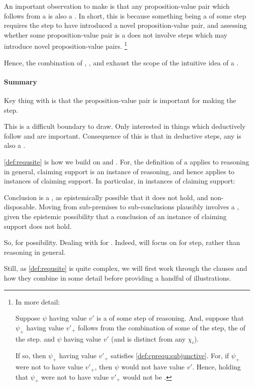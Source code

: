 \begin{note}
  An important observation to make is that any proposition-value pair which follows from a \cprequ{} is also a \cprequ{}.
  In short, this is because something being a \cprequ{} of some step requires the step to have introduced a novel proposition-value pair, and assessing whether some proposition-value pair is a \cprequ{} does not involve steps which may introduce novel proposition-value pairs.\nolinebreak
  \footnote{
    In more detail:

    Suppose \(\psi\) having value \(v'\) is a \cprequ{} of some step of reasoning.
    And, suppose that \(\psi_{+}\) having value \(v'_{+}\) follows from the combination of some  of the step, the  of the step. and \(\psi\) having value \(v'\) (and is distinct from any \(\chi_{i}\)).

    If so, then \(\psi_{+}\) having value \(v'_{+}\) satisfies \ref{def:cprequ:subjunctive}.
    For, if \(\psi_{+}\) were not to have value \(v'_{+}\), then \(\psi\) would not have value \(v'\).
    Hence, holding that \(\psi_{+}\) were not to have value \(v'_{+}\) would not be \epAdv{}.
  }

  Hence, the combination of , , and  exhaust the scope of the intuitive idea of a \requ{}.
\end{note}

\paragraph{Summary}

\begin{note}
  Key thing with  is that the proposition-value pair is important for making the step.

  This is a difficult boundary to draw.
  Only interested in things which deductively follow and are important.
  Consequence of this is that in deductive steps, any \crequ{} is also a \prequ{}.
\end{note}


\begin{note}
  \autoref{def:requsite} is how we build on \ideaCSA{} and \ideaCSB{}.
  For, the definition of a \requ{} applies to reasoning in general, claiming support is an instance of reasoning, and hence applies to instances of claiming support.
  In particular, in instances of claiming support:
  {
    \color{reword}
    Conclusion is a \requ{}, as epistemically possible that it does not hold, and non-disposable.
    Moving from sub-premises to sub-conclusions plausibly involves a \requ{}, given the epistemic possibility that a conclusion of an instance of claiming support does not hold.

    So, \ideaCSA{} for possibility.
    Dealing with  for \ideaCSB{}.
    Indeed, \ideaCSB{} will focus on \requ{} for step, rather than reasoning in general.
  }

  Still, as \autoref{def:requsite} is quite complex, we will first work through the clauses and how they combine in some detail before providing a handful of illustrations.
\end{note}

